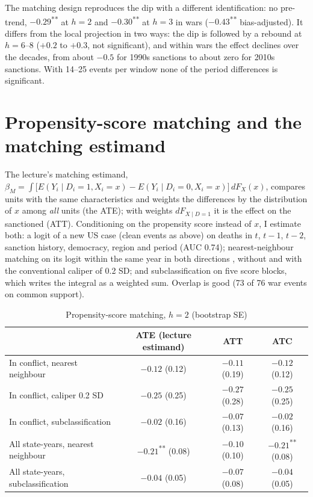\documentclass[11pt,a4paper]{article}
\newcommand{\sig}[1]{\textsuperscript{#1}}
\begin{document}
The matching design reproduces the dip with a different identification: no pre-trend, $-0.29$\sig{**} at $h=2$ and
$-0.30$\sig{**} at $h=3$ in wars ($-0.43$\sig{**} bias-adjusted). It differs from the local projection in two ways: the
dip is followed by a rebound at $h=6$--8 ($+0.2$ to $+0.3$, not significant), and within wars the effect declines
over the decades, from about $-0.5$ for 1990s sanctions to about zero for 2010s sanctions. With 14--25 events per
window none of the period differences is significant.

\section{Propensity-score matching and the matching estimand}
\label{sec:pscore}

The lecture's matching estimand,
$\beta_M = \int \big[E(Y_i\mid D_i=1,X_i=x) - E(Y_i\mid D_i=0,X_i=x)\big]\,dF_X(x)$, compares units with the same
characteristics and weights the differences by the distribution of $x$ among \emph{all} units (the ATE); with weights
$dF_{X\mid D=1}$ it is the effect on the sanctioned (ATT). Conditioning on the propensity score instead of $x$, I
estimate both: a logit of a new US case (clean events as above) on deaths in $t$, $t-1$, $t-2$, sanction history,
democracy, region and period (AUC 0.74); nearest-neighbour matching on its logit within the same year in both
directions \citep{abadieimbens2006}, without and with the conventional caliper of 0.2 SD; and subclassification on five
score blocks, which writes the integral as a weighted sum. Overlap is good (73 of 76 war events on common support).

\begin{table}[H]
\centering\small
\caption{Propensity-score matching, $h=2$ (bootstrap SE)}
\begin{tabular}{@{}lccc@{}}
\toprule
& ATE (lecture estimand) & ATT & ATC \\
\midrule
In conflict, nearest neighbour & $-0.12$ (0.12) & $-0.11$ (0.19) & $-0.12$ (0.12) \\
In conflict, caliper 0.2 SD & $-0.25$ (0.25) & $-0.27$ (0.28) & $-0.25$ (0.25) \\
In conflict, subclassification & $-0.02$ (0.16) & $-0.07$ (0.13) & $-0.02$ (0.16) \\
All state-years, nearest neighbour & $-0.21$\sig{**} (0.08) & $-0.10$ (0.10) & $-0.21$\sig{**} (0.08) \\
All state-years, subclassification & $-0.04$ (0.05) & $-0.07$ (0.08) & $-0.04$ (0.05) \\
\bottomrule
\end{tabular}
\end{table}
\end{document}
